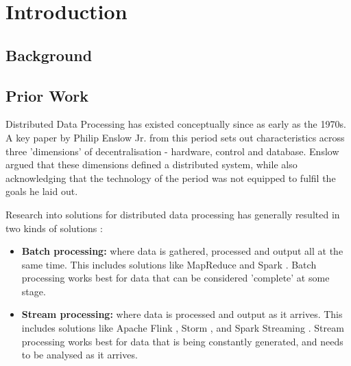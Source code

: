 \chapter{Introduction}


\section{Background}



\section{Prior Work}

Distributed Data Processing has existed conceptually since as early as the 1970s. A key paper by Philip Enslow Jr. from this period \cite{enslow1978distributed} sets out characteristics across three 'dimensions' of decentralisation - hardware, control and database. Enslow argued that these dimensions defined a distributed system, while also acknowledging that the technology of the period was not equipped to fulfil the goals he laid out.

Research into solutions for distributed data processing has generally resulted in two kinds of solutions \cite{yaqoob2016big}:
\begin{itemize}
	\item \textbf{Batch processing:} where data is gathered, processed and output all at the same time. This includes solutions like MapReduce \cite{dean2008mapreduce} and Spark \cite{zaharia2016spark}. Batch processing works best for data that can be considered 'complete' at some stage.
	\item \textbf{Stream processing:} where data is processed and output as it arrives. This includes solutions like Apache Flink \cite{carbone2015flink}, Storm \cite{toshniwal2014storm}, and Spark Streaming \cite{armbrust2018sparkstreaming}. Stream processing works best for data that is being constantly generated, and needs to be analysed as it arrives.
\end{itemize}

